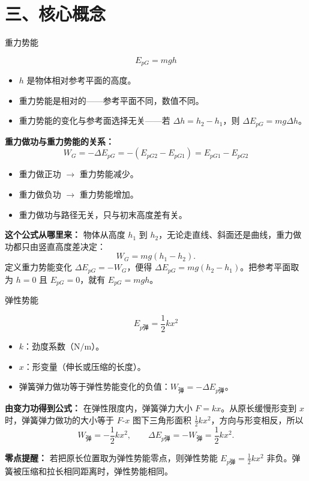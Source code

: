 \section*{三、核心概念}

\begin{conceptbox}{重力势能}

\[
\boxed{E_{pG} = mgh}
\]

\begin{itemize}
  \item $h$ 是物体相对参考平面的高度。
  \item 重力势能是相对的——参考平面不同，数值不同。
  \item 重力势能的变化与参考面选择无关——若 $\Delta h=h_2-h_1$，则 $\Delta E_{pG} = mg\Delta h$。
\end{itemize}

\textbf{重力做功与重力势能的关系：}
\[
W_G = -\Delta E_{pG} = -(E_{pG2} - E_{pG1}) = E_{pG1} - E_{pG2}
\]

\begin{itemize}
  \item 重力做正功 $\to$ 重力势能减少。
  \item 重力做负功 $\to$ 重力势能增加。
  \item 重力做功与路径无关，只与初末高度差有关。
\end{itemize}

\textbf{这个公式从哪里来：} 物体从高度 $h_1$ 到 $h_2$，无论走直线、斜面还是曲线，重力做功都只由竖直高度差决定：
\[
W_G=mg(h_1-h_2).
\]
定义重力势能变化 $\Delta E_{pG}=-W_G$，便得 $\Delta E_{pG}=mg(h_2-h_1)$。把参考平面取为 $h=0$ 且 $E_{pG}=0$，就有 $E_{pG}=mgh$。

\end{conceptbox}

\begin{conceptbox}{弹性势能}

\[
\boxed{E_{p\text{弹}} = \frac12 k x^2}
\]

\begin{itemize}
  \item $k$：劲度系数（$\mathrm{N/m}$）。
  \item $x$：形变量（伸长或压缩的长度）。
  \item 弹簧弹力做功等于弹性势能变化的负值：$W_{\text{弹}} = -\Delta E_{p\text{弹}}$。
\end{itemize}

\textbf{由变力功得到公式：} 在弹性限度内，弹簧弹力大小 $F=kx$。从原长缓慢形变到 $x$ 时，弹簧弹力做功的大小等于 $F$-$x$ 图下三角形面积 $\frac12kx^2$，方向与形变相反，所以
\[
W_{\text{弹}}=-\frac12kx^2,\qquad \Delta E_{p\text{弹}}=-W_{\text{弹}}=\frac12kx^2.
\]

\textbf{零点提醒：} 若把原长位置取为弹性势能零点，则弹性势能 $E_{p\text{弹}}=\frac12kx^2$ 非负。弹簧被压缩和拉长相同距离时，弹性势能相同。

\begin{center}


\label{fig:potential-energy-origin}
\end{center}

\end{conceptbox}


